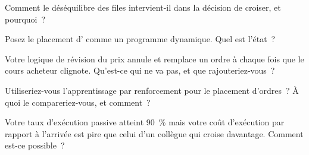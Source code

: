 \begin{interviewq}\label{iq:mx:child-order-placement:2}
Comment le déséquilibre des files intervient-il dans la décision de croiser, et pourquoi~?
\end{interviewq}

\begin{interviewq}\label{iq:mx:child-order-placement:3}
Posez le placement d' comme un programme dynamique. Quel est l'état~?
\end{interviewq}

\begin{interviewq}\label{iq:mx:child-order-placement:4}
Votre logique de révision du prix annule et remplace un ordre à chaque fois que le cours acheteur clignote. Qu'est-ce qui ne va pas, et que rajouteriez-vous~?
\end{interviewq}

\begin{interviewq}\label{iq:mx:child-order-placement:5}
Utiliseriez-vous l'apprentissage par renforcement pour le placement d'ordres~? À quoi le compareriez-vous, et comment~?
\end{interviewq}

\begin{interviewq}\label{iq:mx:child-order-placement:6}
Votre taux d'exécution passive atteint 90~\% mais votre coût d'exécution par rapport à l'arrivée est pire que celui d'un collègue qui croise davantage. Comment est-ce possible~?
\end{interviewq}
